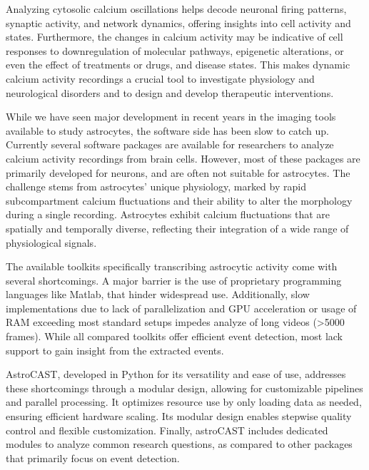 Analyzing cytosolic calcium oscillations helps decode neuronal firing patterns, synaptic activity, and network dynamics, offering insights into cell activity and states\citep{del_negro_sodium_2005,grienberger_imaging_2012,dombeck_imaging_2007}. Furthermore, the changes in calcium activity may be indicative of cell responses to downregulation of molecular pathways, epigenetic alterations, or even the effect of treatments or drugs, and disease states\citep{lines_astrocytes_2020,miller_calcium_2023,robil_glioblastoma_2015,huang_vitro_2013,britti_tau_2020,zhang_estrogen_2010}. This makes dynamic calcium activity recordings a crucial tool to investigate physiology and neurological disorders and to design and develop therapeutic interventions.

While we have seen major development in recent years in the imaging tools available to study astrocytes, the software side has been slow to catch up\citep{gorzo_photonics_2022,aryal_er-gcamp6f_2022,stobart_cortical_2018}. Currently several software packages are available for researchers to analyze calcium activity recordings from brain cells. However, most of these packages are primarily developed for neurons, and are often not suitable for astrocytes. The challenge stems from astrocytes' unique physiology, marked by rapid subcompartment calcium fluctuations\citep{stobart_long-term_2018,curreli_complementary_2022} and their ability to alter the morphology during a single recording\citep{anders_epileptic_2024,baorto_astrocyte_1992}. Astrocytes exhibit calcium fluctuations that are spatially and temporally diverse, reflecting their integration  of a wide range of physiological signals\citep{semyanov_making_2020,smedler_frequency_2014,denizot_simulation_2019,papouin_astrocytic_2017,bazargani_astrocyte_2016}.

The available toolkits specifically transcribing astrocytic activity come with several shortcomings. A major barrier is the use of proprietary programming languages like Matlab, that hinder widespread use. Additionally, slow implementations due to lack of parallelization and \ac{GPU} acceleration or usage of RAM exceeding most standard setups impedes analyze of long videos (>5000 frames). While all compared toolkits offer efficient event detection, most lack support to gain insight from the extracted events.

AstroCAST, developed in Python for its versatility and ease of use, addresses these shortcomings through a modular design, allowing for customizable pipelines and parallel processing.  It optimizes resource use by only loading data as needed, ensuring efficient hardware scaling. Its modular design enables stepwise quality control and flexible customization. Finally, astroCAST includes dedicated modules to analyze common research questions, as compared to other packages that primarily focus on event detection.

